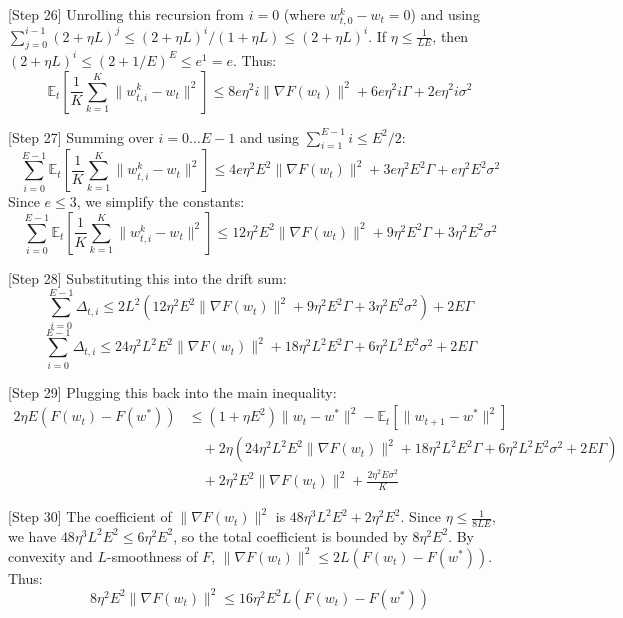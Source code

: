 \documentclass{article}
\begin{document}
[Step 26] Unrolling this recursion from $i=0$ (where $w_{t,0}^k - w_t = 0$) and using $\sum_{j=0}^{i-1} (2+\eta L)^j \leq (2+\eta L)^i / (1+\eta L) \leq (2+\eta L)^i$. If $\eta \leq \frac{1}{LE}$, then $(2+\eta L)^i \leq (2+1/E)^E \leq e^1 = e$. Thus:
$$ \mathbb{E}_t\left[ \frac{1}{K}\sum_{k=1}^K \|w_{t,i}^k - w_t\|^2 \right] \leq 8e \eta^2 i \|\nabla F(w_t)\|^2 + 6e \eta^2 i \Gamma + 2e \eta^2 i \sigma^2 $$

[Step 27] Summing over $i=0 \dots E-1$ and using $\sum_{i=1}^{E-1} i \leq E^2/2$:
$$ \sum_{i=0}^{E-1} \mathbb{E}_t\left[ \frac{1}{K}\sum_{k=1}^K \|w_{t,i}^k - w_t\|^2 \right] \leq 4e \eta^2 E^2 \|\nabla F(w_t)\|^2 + 3e \eta^2 E^2 \Gamma + e \eta^2 E^2 \sigma^2 $$
Since $e \leq 3$, we simplify the constants:
$$ \sum_{i=0}^{E-1} \mathbb{E}_t\left[ \frac{1}{K}\sum_{k=1}^K \|w_{t,i}^k - w_t\|^2 \right] \leq 12 \eta^2 E^2 \|\nabla F(w_t)\|^2 + 9 \eta^2 E^2 \Gamma + 3 \eta^2 E^2 \sigma^2 $$

[Step 28] Substituting this into the drift sum:
$$ \sum_{i=0}^{E-1} \Delta_{t,i} \leq 2L^2 (12 \eta^2 E^2 \|\nabla F(w_t)\|^2 + 9 \eta^2 E^2 \Gamma + 3 \eta^2 E^2 \sigma^2) + 2E\Gamma $$
$$ \sum_{i=0}^{E-1} \Delta_{t,i} \leq 24\eta^2 L^2 E^2 \|\nabla F(w_t)\|^2 + 18\eta^2 L^2 E^2 \Gamma + 6\eta^2 L^2 E^2 \sigma^2 + 2E\Gamma $$

[Step 29] Plugging this back into the main inequality:
\begin{align*}
2\eta E (F(w_t) - F(w^*)) &\leq (1 + \eta E^2)\|w_t - w^*\|^2 - \mathbb{E}_t[\|w_{t+1} - w^*\|^2] \\
&\quad + 2\eta (24\eta^2 L^2 E^2 \|\nabla F(w_t)\|^2 + 18\eta^2 L^2 E^2 \Gamma + 6\eta^2 L^2 E^2 \sigma^2 + 2E\Gamma) \\
&\quad + 2\eta^2 E^2 \|\nabla F(w_t)\|^2 + \frac{2\eta^2 E \sigma^2}{K}
\end{align*}

[Step 30] The coefficient of $\|\nabla F(w_t)\|^2$ is $48\eta^3 L^2 E^2 + 2\eta^2 E^2$. Since $\eta \leq \frac{1}{8LE}$, we have $48\eta^3 L^2 E^2 \leq 6\eta^2 E^2$, so the total coefficient is bounded by $8\eta^2 E^2$. By convexity and $L$-smoothness of $F$, $\|\nabla F(w_t)\|^2 \leq 2L(F(w_t) - F(w^*))$. Thus:
$$ 8\eta^2 E^2 \|\nabla F(w_t)\|^2 \leq 16\eta^2 E^2 L (F(w_t) - F(w^*)) $$
\end{document}
